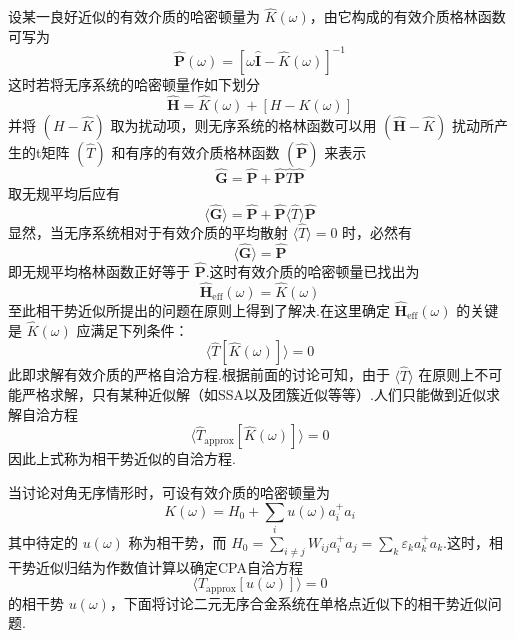 设某一良好近似的有效介质的哈密顿量为 $\hat{K}\left(\omega\right)$，由它构成的有效介质格林函数可写为
\begin{equation}
  \hat{\boldsymbol{P}}\left(\omega\right)=\left[\omega\hat{\boldsymbol{I}}-\hat{K}\left(\omega\right)\right]^{-1}
\end{equation}
这时若将无序系统的哈密顿量作如下划分
\begin{equation}
  \hat{\boldsymbol{H}}=\hat{K}\left(\omega\right)+\left[H-K\left(\omega\right)\right]
\end{equation}
并将 $\left(H-\hat{K}\right)$ 取为扰动项，则无序系统的格林函数可以用 $\left(\hat{\boldsymbol{H}}-\hat{K}\right)$ 扰动所产生的t矩阵 $\left(\hat{T}\right)$ 和有序的有效介质格林函数 $\left(\hat{\boldsymbol{P}}\right)$ 来表示
\begin{equation}
  \hat{\boldsymbol{G}}=\hat{\boldsymbol{P}}+\hat{\boldsymbol{P}}\hat{T}\hat{\boldsymbol{P}}
\end{equation}
取无规平均后应有
\begin{equation}
  \langle\hat{\boldsymbol{G}}\rangle=\hat{\boldsymbol{P}}+\hat{\boldsymbol{P}}\langle\hat{T}\rangle\hat{\boldsymbol{P}}
\end{equation}
显然，当无序系统相对于有效介质的平均散射 $\langle\hat{T}\rangle=0$ 时，必然有
\begin{equation}
  \langle\hat{\boldsymbol{G}}\rangle=\hat{\boldsymbol{P}}
\end{equation}
即无规平均格林函数正好等于 $\hat{\boldsymbol{P}}$.这时有效介质的哈密顿量已找出为
\begin{equation}
  \hat{\boldsymbol{H}}_{\mathrm{eff}}\left(\omega\right)=\hat{K}\left(\omega\right)
\end{equation}
至此相干势近似所提出的问题在原则上得到了解决.在这里确定 $\hat{\boldsymbol{H}}_{\mathrm{eff}}\left(\omega\right)$ 的关键是 $\hat{K}\left(\omega\right)$ 应满足下列条件：
\begin{equation}
  \langle\hat{T}\left[\hat{K}\left(\omega\right)\right]\rangle=0
\end{equation}
此即求解有效介质的严格自洽方程.根据前面的讨论可知，由于 $\langle\hat{T}\rangle$ 在原则上不可能严格求解，只有某种近似解（如SSA以及团簇近似等等）.人们只能做到近似求解自洽方程
\begin{equation}
  \langle\hat{T}_{\mathrm{approx}}\left[\hat{K}\left(\omega\right)\right]\rangle=0
\end{equation}
因此上式称为相干势近似的自洽方程.

当讨论对角无序情形时，可设有效介质的哈密顿量为
\begin{equation}
  K\left(\omega\right)=H_{0}+\sum_{i}u\left(\omega\right)a_{i}^{+}a_{i}
\end{equation}
其中待定的 $u\left(\omega\right)$ 称为相干势，而 $H_{0}=\sum_{i\neq j}W_{ij}a_{i}^{+}a_{j}=\sum_{k}\varepsilon_{k}a_{k}^{+}a_{k}$.这时，相干势近似归结为作数值计算以确定CPA自洽方程
\begin{equation}
  \langle T_{\mathrm{approx}}\left[u\left(\omega\right)\right]\rangle=0
\end{equation}
的相干势 $u\left(\omega\right)$，下面将讨论二元无序合金系统在单格点近似下的相干势近似问题.

